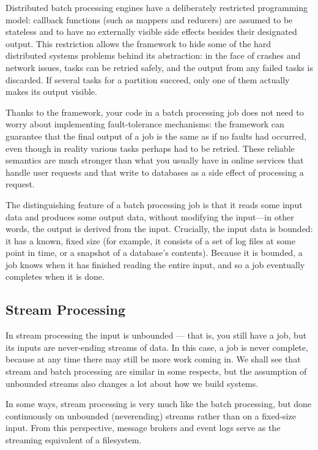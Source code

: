 \documentclass{article}
\begin{document}
    Distributed batch processing engines have a deliberately restricted programming model: callback functions (such as mappers and reducers) are assumed to be stateless and to have no externally visible side effects besides their designated output. This restriction allows the framework to hide some of the hard distributed systems problems behind its abstraction: in the face of crashes and network issues, tasks can be retried safely, and the output from any failed tasks is discarded. If several tasks for a partition succeed, only one of them actually makes its output visible.
    
    Thanks to the framework, your code in a batch processing job does not need to worry about implementing fault-tolerance mechanisms: the framework can guarantee that the final output of a job is the same as if no faults had occurred, even though in reality various tasks perhaps had to be retried. These reliable semantics are much stronger than what you usually have in online services that handle user requests and that write to databases as a side effect of processing a request.
    
    The distinguishing feature of a batch processing job is that it reads some input data and produces some output data, without modifying the input—in other words, the output is derived from the input. Crucially, the input data is bounded: it has a known, fixed size (for example, it consists of a set of log files at some point in time, or a snapshot of a database’s contents). Because it is bounded, a job knows when it has finished reading the entire input, and so a job eventually completes when it is done.
    
    \subsection{Stream Processing }
    
    In stream processing the input is unbounded — that is, you still have a job, but its inputs are never-ending streams of data. In this case, a job is never complete, because at any time there may still be more work coming in. We shall see that stream and batch processing are similar in some respects, but the assumption of unbounded streams also changes a lot about how we build systems.
    
    In some ways, stream processing is very much like the batch processing, but done continuously on unbounded (neverending) streams rather than on a fixed-size input. From this perspective, message brokers and event logs serve as the streaming equivalent of a filesystem.
\end{document}
